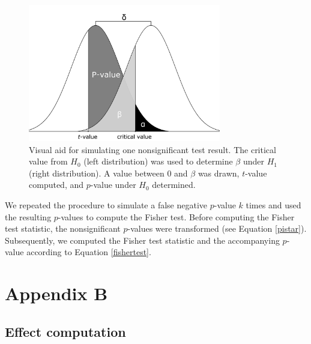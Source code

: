 \documentclass{article}
\begin{document}
\begin{figure}[!ht]
\centering
\includegraphics[width=0.75\textwidth]{../figures/appendix_a}
\caption{Visual aid for simulating one nonsignificant test result. The critical value from $H_0$ (left distribution) was used to determine $\beta$ under $H_1$ (right distribution). A value between 0 and $\beta$ was drawn, $t$-value computed, and $p$-value under $H_0$ determined.}
\label{fig:appendixa}
\end{figure}

We repeated the procedure to simulate a false negative $p$-value $k$ times and used the resulting $p$-values to compute the Fisher test. Before computing the Fisher test statistic, the nonsignificant $p$-values were transformed (see Equation \ref{pistar}). Subsequently, we computed the Fisher test statistic and the accompanying $p$-value according to Equation \ref{fishertest}. 

\section*{Appendix B}
\label{apB}
\subsection*{Effect computation}
\end{document}
